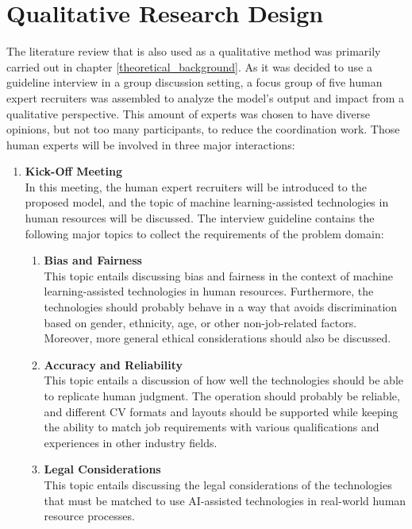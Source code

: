 \documentclass[draft,final]{thesisclass} %
\begin{document}
\section{Qualitative Research Design} \label{qualitative_research_design}
The literature review that is also used as a qualitative method was primarily carried out in chapter \ref{theoretical_background}.
As it was decided to use a guideline interview in a group discussion setting, a focus group of five human expert recruiters was assembled to analyze the model's output and impact from a qualitative perspective.
This amount of experts was chosen to have diverse opinions, but not too many participants, to reduce the coordination work.
Those human experts will be involved in three major interactions:
\begin{enumerate}
    \item \textbf{Kick-Off Meeting} \label{kick_off_meeting}\\ 
    In this meeting, the human expert recruiters will be introduced to the proposed model, and the topic of machine learning-assisted technologies in human resources will be discussed.
    The interview guideline contains the following major topics to collect the requirements of the problem domain:
    \begin{enumerate}
        \item \textbf{Bias and Fairness}\\
        This topic entails discussing bias and fairness in the context of machine learning-assisted technologies in human resources.
        Furthermore, the technologies should probably behave in a way that avoids discrimination based on gender, ethnicity, age, or other non-job-related factors.
        Moreover, more general ethical considerations should also be discussed.
        \item \textbf{Accuracy and Reliability}\\
        This topic entails a discussion of how well the technologies should be able to replicate human judgment.
        The operation should probably be reliable, and different \acs{CV} formats and layouts should be supported while keeping the ability to match job requirements with various qualifications and experiences in other industry fields.
        \item \textbf{Legal Considerations}\\
        This topic entails discussing the legal considerations of the technologies that must be matched to use \acs{AI}-assisted technologies in real-world human resource processes.

\end{enumerate}
\end{enumerate}
\end{document}
